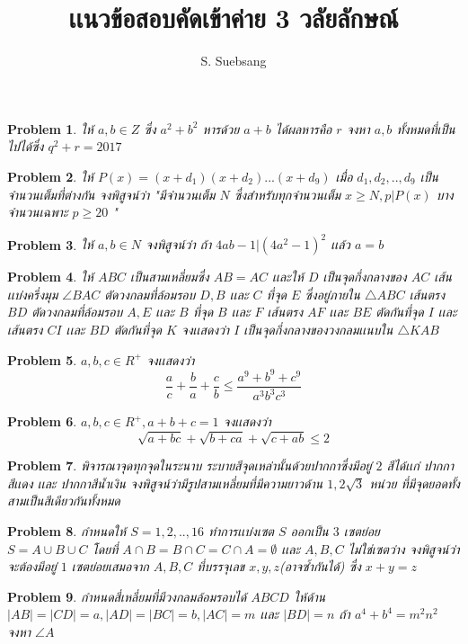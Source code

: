 \documentclass[a4paper,12pt]{article}
\author{S. Suebsang}
\title{\textbf{เเนวข้อสอบคัดเข้าค่าย 3 วลัยลักษณ์}}
\newtheorem{problem}{Problem}
\begin{document}
	\maketitle
	\begin{problem}
		ให้ $a,b \in Z$ ซึ่ง $a^2+b^2$ หารด้วย $a+b$ ได้ผลหารคือ $r$ จงหา $a,b$ ทั้งหมดที่เป็นไปได้ซึ่ง $q^2+r=2017$
	\end{problem}
	\begin{problem}
		ให้ $P(x)=(x+d_1)(x+d_2)...(x+d_9)$ เมื่อ $d_1,d_2,..,d_9$ เป็นจำนวนเต็มที่ต่างกัน จงพิสูจน์ว่า "มีจำนวนเต็ม $N$ ซึ่งสำหรับทุกจำนวนเต็ม $x\ge N, p|P(x)$ บางจำนวนเฉพาะ $p\ge 20$ "
	\end{problem}
	\begin{problem}
		ให้ $a,b \in N$ จงพิสูจน์ว่า ถ้า $4ab-1|(4a^2-1)^2$ เเล้ว $a=b$
	\end{problem}
	\begin{problem}
		ให้ $ABC$ เป็นสามเหลี่ยมซึ่ง $AB = AC$ เเละให้ $D$ เป็นจุดกึ่งกลางของ $AC$ เส้นเเบ่งครึ่งมุม $\angle{BAC}$ ตัดวงกลมที่ล้อมรอบ $D,B$ เเละ $C$ ที่จุด $E$ ซึ่งอยู่ภายใน $\bigtriangleup{ABC}$  เส้นตรง $BD$ ตัดวงกลมที่ล้อมรอบ $A,E$ เเละ $B$ ที่จุด $B$ เเละ $F$ เส้นตรง $AF$ เเละ $BE$ ตัดกันที่จุด $I$ เเละ เส้นตรง $CI$ เเละ $BD$ ตัดกันที่จุด $K$ จงเเสดงว่า $I$ เป็นจุดกึ่งกลางของวงกลมเเนบใน $\bigtriangleup{KAB}$
	\end{problem}
	\begin{problem}
		$a,b,c \in R^+$ จงเเสดงว่า $$\frac{a}{c}+\frac{b}{a} +\frac{c}{b} \le \frac{a^9+b^9+c^9}{a^3b^3c^3}$$
	\end{problem}
	\begin{problem}
		$a,b,c \in R^+,a+b+c =1$ จงเเสดงว่า $$\sqrt{a+bc}+\sqrt{b+ca}+\sqrt{c+ab} \le 2$$
	\end{problem}
	\begin{problem}
		พิจารณาจุดทุกจุดในระนาบ ระบายสีจุดเหล่านั้นด้วยปากกาซึ่งมีอยู่ $2$ สีได้เเก่ ปากกาสีเเดง เเละ ปากกาสีน้ำเงิน จงพิสูจน์ว่ามีรูปสามเหลี่ยมที่มีความยาวด้าน $1,2\sqrt{3}$ หน่วย ที่มีจุดยอดทั้งสามเป็นสีเดียวกันทั้งหมด
	\end{problem}
	\begin{problem}
		กำหนดให้ $S = {1,2,..,16}$ ทำการเเบ่งเซต $S$ ออกเป็น $3$ เซตย่อย $S=A\cup{B}\cup{C}$ โดยที่ $A\cap{B}=B\cap{C}=C\cap{A}=\emptyset$ เเละ $A,B,C$ ไม่ใช่เซตว่าง 
		จงพิสูจน์ว่า จะต้องมีอยู่ $1$ เซตย่อยเสมอจาก $A,B,C$ ที่บรรจุเลข $x,y,z$(อาจซ้ำกันได้) ซึ่ง $x+y=z$ 
	\end{problem}
	\begin{problem}
		กำหนดสี่เหลี่ยมที่มีวงกลมล้อมรอบได้ $ABCD$ ให้ด้าน $|AB|=|CD|=a , |AD|=|BC|=b , |AC|=m$ เเละ $|BD|=n$ ถ้า $a^4+b^4=m^2n^2$ จงหา $\angle{A}$
	\end{problem}
\end{document}
